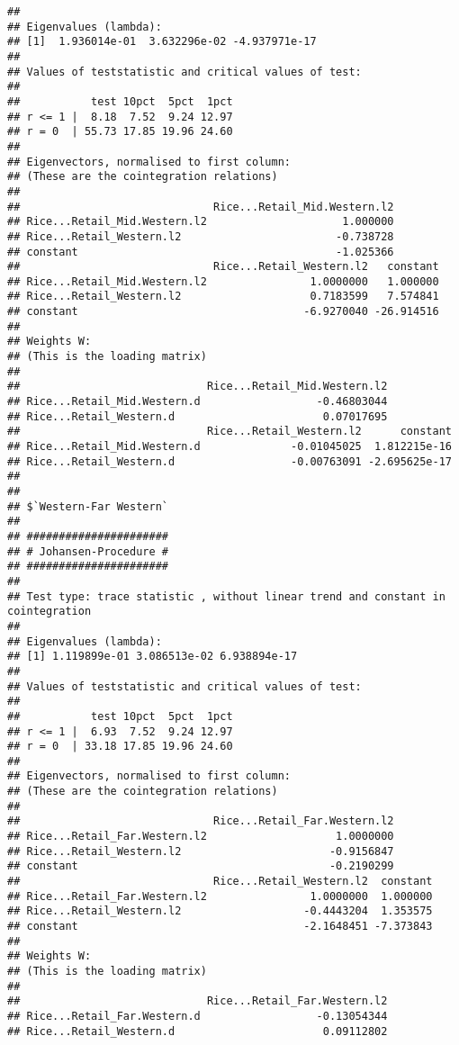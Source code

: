 \documentclass[12pt,]{article}
\begin{document}
\begin{verbatim}
## 
## Eigenvalues (lambda):
## [1]  1.936014e-01  3.632296e-02 -4.937971e-17
## 
## Values of teststatistic and critical values of test:
## 
##           test 10pct  5pct  1pct
## r <= 1 |  8.18  7.52  9.24 12.97
## r = 0  | 55.73 17.85 19.96 24.60
## 
## Eigenvectors, normalised to first column:
## (These are the cointegration relations)
## 
##                              Rice...Retail_Mid.Western.l2
## Rice...Retail_Mid.Western.l2                     1.000000
## Rice...Retail_Western.l2                        -0.738728
## constant                                        -1.025366
##                              Rice...Retail_Western.l2   constant
## Rice...Retail_Mid.Western.l2                1.0000000   1.000000
## Rice...Retail_Western.l2                    0.7183599   7.574841
## constant                                   -6.9270040 -26.914516
## 
## Weights W:
## (This is the loading matrix)
## 
##                             Rice...Retail_Mid.Western.l2
## Rice...Retail_Mid.Western.d                  -0.46803044
## Rice...Retail_Western.d                       0.07017695
##                             Rice...Retail_Western.l2      constant
## Rice...Retail_Mid.Western.d              -0.01045025  1.812215e-16
## Rice...Retail_Western.d                  -0.00763091 -2.695625e-17
## 
## 
## $`Western-Far Western`
## 
## ###################### 
## # Johansen-Procedure # 
## ###################### 
## 
## Test type: trace statistic , without linear trend and constant in cointegration 
## 
## Eigenvalues (lambda):
## [1] 1.119899e-01 3.086513e-02 6.938894e-17
## 
## Values of teststatistic and critical values of test:
## 
##           test 10pct  5pct  1pct
## r <= 1 |  6.93  7.52  9.24 12.97
## r = 0  | 33.18 17.85 19.96 24.60
## 
## Eigenvectors, normalised to first column:
## (These are the cointegration relations)
## 
##                              Rice...Retail_Far.Western.l2
## Rice...Retail_Far.Western.l2                    1.0000000
## Rice...Retail_Western.l2                       -0.9156847
## constant                                       -0.2190299
##                              Rice...Retail_Western.l2  constant
## Rice...Retail_Far.Western.l2                1.0000000  1.000000
## Rice...Retail_Western.l2                   -0.4443204  1.353575
## constant                                   -2.1648451 -7.373843
## 
## Weights W:
## (This is the loading matrix)
## 
##                             Rice...Retail_Far.Western.l2
## Rice...Retail_Far.Western.d                  -0.13054344
## Rice...Retail_Western.d                       0.09112802

\end{verbatim}
\end{document}
